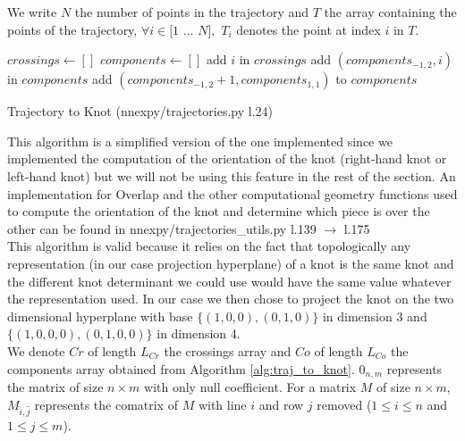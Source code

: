 \documentclass[12pt, a4paper]{article}
\begin{document}
We write $N$ the number of points in the trajectory and $T$ the array containing the points of the trajectory, $\forall i \in [1$ $...$ $N],$  $T_i$ denotes the point at index $i$ in $T$.\\

\begin{algorithm}[H]
  \begin{algorithmic}[1]
    \STATE $crossings \gets []$
    \STATE $components \gets []$
    \STATE add $i$ in $crossings$
    \STATE add $(components_{-1,2},i)$ in $components$
    \ENDIF
    \ENDIF
    \ENDFOR
    \ENDFOR
    \STATE add $(components_{-1,2} + 1, components_{1,1})$ to $components$
  \end{algorithmic}
  \caption{Trajectory to Knot ({\selectfont nnexpy/trajectories.py l.24})}
  \label{alg:traj_to_knot}
\end{algorithm}

This algorithm is a simplified version of the one implemented since we implemented the computation of the orientation of the knot (right-hand knot or left-hand knot) but we will not be using this feature in the rest of the section. An implementation for {\selectfont Overlap} and the other computational geometry functions used to compute the orientation of the knot and determine which piece is over the other can be found in {\selectfont nnexpy/trajectories\_utils.py l.139 $\to$ l.175}\\

This algorithm is valid because it relies on the fact that topologically any representation (in our case projection hyperplane) of a knot is the same knot and the different knot determinant we could use would have the same value whatever the representation used. In our case we then chose to project the knot on the two dimensional hyperplane with base $\{(1,0,0), (0,1,0)\}$ in dimension 3 and $\{(1,0,0,0), (0,1,0,0)\}$ in dimension 4.\\  

We denote $Cr$ of length $L_{Cr}$ the crossings array and $Co$ of length $L_{Co}$ the components array obtained from Algorithm \ref{alg:traj_to_knot}. $0_{n,m}$ represents the matrix of size $n \times m$ with only null coefficient. For a matrix $M$ of size $n \times m$, $M_{\widehat{i},\widehat{j}}$ represents the comatrix of $M$ with line $i$ and row $j$ removed ($1 \le i \le n$ and $1 \le j \le m$).
\end{document}

